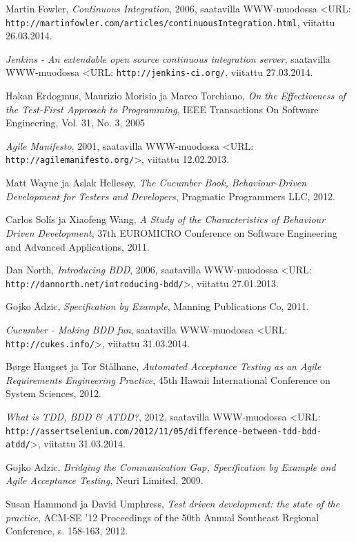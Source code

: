 \documentclass[finnish,nonumbib,nocopyright]{gradu2}
\begin{document}
\begin{thebibliography}{9}
Martin Fowler, \textit{Continuous Integration}, 2006, saatavilla WWW-muodossa
<URL: \texttt{http://martinfowler.com/articles/continuousIntegration.html}, viitattu 26.03.2014.

\textit{Jenkins - An extendable open source continuous integration server}, saatavilla WWW-muodossa
<URL: \texttt{http://jenkins-ci.org/}, viitattu 27.03.2014.

Hakan Erdogmus, Maurizio Morisio ja Marco Torchiano, \textit{On the Effectiveness of the Test-First Approach to Programming}, IEEE Transactions On Software Engineering, Vol. 31, No. 3, 2005

\textit{Agile Manifesto}, 2001, saatavilla WWW-muodossa
<URL: \texttt{http://agilemanifesto.org/}>, viitattu 12.02.2013.

Matt Wayne ja Aslak Hellesøy, \textit{The Cucumber Book, Behaviour-Driven Development for Testers and Developers},
Pragmatic Programmers LLC, 2012.

Carlos Solís ja Xiaofeng Wang, \textit{A Study of the Characteristics of Behaviour Driven Development},
37th EUROMICRO Conference on Software Engineering and Advanced Applications, 2011.

Dan North, \textit{Introducing BDD}, 2006, saatavilla WWW-muodossa
<URL: \texttt{http://dannorth.net/introducing-bdd/}>, viitattu 27.01.2013.

Gojko Adzic, \textit{Specification by Example},
Manning Publications Co, 2011.

\textit{Cucumber - Making BDD fun}, saatavilla WWW-muodossa
<URL: \texttt{http://cukes.info/}>, viitattu 31.03.2014.

Børge Haugset ja Tor Stålhane, \textit{Automated Acceptance Testing as an Agile Requirements Engineering Practice},
45th Hawaii International Conference on System Sciences, 2012.

\textit{What is TDD, BDD \& ATDD?}, 2012, saatavilla WWW-muodossa
<URL: \texttt{http://assertselenium.com/2012/11/05/difference-between-tdd-bdd-atdd/}>, viitattu 31.03.2014.

Gojko Adzic, \textit{Bridging the Communication Gap, Specification by Example and Agile Acceptance Testing},
Neuri Limited, 2009.

Susan Hammond ja David Umphress, \textit{Test driven development: the state of the practice},
ACM-SE '12 Proceedings of the 50th Annual Southeast Regional Conference, s. 158-163, 2012.


\end{thebibliography}
\end{document}

